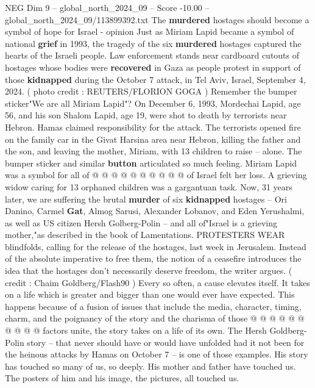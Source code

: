 \begin{textsample}{NEG Dim 9 – global\_north\_2024\_09 – Score -10.00 – global\_north\_2024\_09/113899392.txt}  \label{ex:f9_neg_018}
The \textbf{murdered} hostages should become a symbol of hope for Israel - opinion Just as Miriam Lapid became a symbol of national \textbf{grief} in 1993, the tragedy of the six \textbf{murdered} hostages captured the hearts of the Israeli people.
Law enforcement stands near cardboard cutouts of hostages whose bodies were \textbf{recovered} in Gaza as people protest in support of those \textbf{kidnapped} during the October 7 attack, in Tel Aviv, Israel, September 4, 2024. ( photo credit : REUTERS/FLORION GOGA ) Remember the bumper sticker"We are all Miriam Lapid"?
On December 6, 1993, Mordechai Lapid, age 56, and his son Shalom Lapid, age 19, were shot to death by terrorists near Hebron.
Hamas claimed responsibility for the attack.
The terrorists opened fire on the family car in the Givat Harsina area near Hebron, killing the father and the son, and leaving the mother, Miriam, with 13 children to raise -- alone.
The bumper sticker and similar \textbf{button} articulated so much feeling.
Miriam Lapid was a symbol for all of @ @ @ @ @ @ @ @ @ @ of Israel felt her loss.
A grieving widow caring for 13 orphaned children was a gargantuan task.
Now, 31 years later, we are suffering the brutal \textbf{murder} of six \textbf{kidnapped} hostages -- Ori Danino, Carmel \textbf{Gat}, Almog Sarusi, Alexander Lobanov, and Eden Yerushalmi, as well as US citizen Hersh Golberg-Polin -- and all of"Israel is a grieving mother,"as described in the book of Lamentations.
PROTESTERS WEAR blindfolds, calling for the release of the hostages, last week in Jerusalem.
Instead of the absolute imperative to free them, the notion of a ceasefire introduces the idea that the hostages don't necessarily deserve freedom, the writer argues. ( credit : Chaim Goldberg/Flash90 ) Every so often, a cause elevates itself.
It takes on a life which is greater and bigger than one would ever have expected.
This happens because of a fusion of issues that include the media, character, timing, charm, and the poignancy of the story and the charisma of those @ @ @ @ @ @ @ @ @ @ factors unite, the story takes on a life of its own.
The Hersh Goldberg-Polin story -- that never should have or would have unfolded had it not been for the heinous attacks by Hamas on October 7 -- is one of those examples.
His story has touched so many of us, so deeply.
His mother and father have touched us.
The posters of him and his image, the pictures, all touched us.

\end{textsample}

